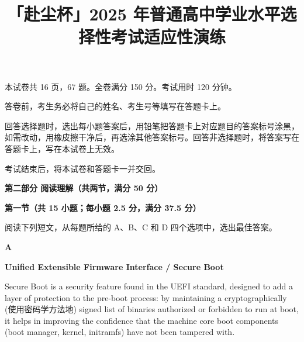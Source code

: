 \documentclass{exam-zh}
\title{「赴尘杯」2025 年普通高中学业水平选择性考试适应性演练}
\begin{document}

\vspace{1\baselineskip}

\secret

\maketitle

本试卷共 16 页，67 题。全卷满分 150 分。考试用时 120 分钟。

\begin{notice}[][itemsep=0pt, parsep=0pt, topsep=0pt, partopsep=0pt]
\item 答卷前，考生务必将自己的姓名、考生号等填写在答题卡上。
\item 回答选择题时，选出每小题答案后，用铅笔把答题卡上对应题目的答案标号涂黑，如需改动，用橡皮擦干净后，再选涂其他答案标号。回答非选择题时，将答案写在答题卡上，写在本试卷上无效。
\item 考试结束后，将本试卷和答题卡一并交回。
\end{notice}


\begin{flushleft}
  {\bfseries 第二部分 \hspace{0.5em} 阅读理解（共两节，满分 50 分）}

  {\bfseries 第一节（共 15 小题；每小题 2.5 分，满分 37.5 分）}
\end{flushleft}

阅读下列短文，从每题所给的 A、B、C 和 D 四个选项中，选出最佳答案。

{\centering \bfseries A \par}

{\centering \bfseries Unified Extensible Firmware Interface / Secure Boot \par}

Secure Boot is a security feature found in the UEFI standard, designed to add a layer of protection to the pre-boot process: by maintaining a cryptographically (使用密码学方法地) signed list of binaries authorized or forbidden to run at boot, it helps in improving the confidence that the machine core boot components (boot manager, kernel, initramfs) have not been tampered with.
\end{document}
